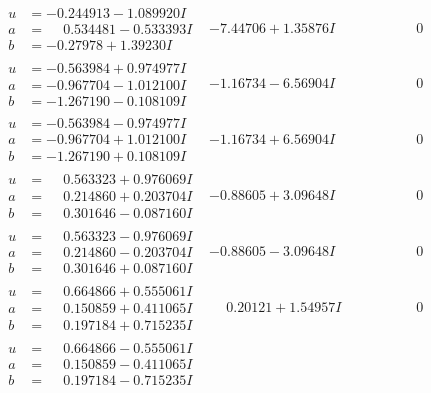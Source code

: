 \documentclass[1p]{elsarticle_modified}
\theoremstyle{definition}
\begin{document}
$$\begin{array}{c|c|c}
\begin{aligned}
u &= -0.244913 - 1.089920 I \\
a &= \phantom{-}0.534481 - 0.533393 I \\
b &= -0.27978 + 1.39230 I\end{aligned}
 & -7.44706 + 1.35876 I & \phantom{-0.000000 } 0 \\ \hline\begin{aligned}
u &= -0.563984 + 0.974977 I \\
a &= -0.967704 - 1.012100 I \\
b &= -1.267190 - 0.108109 I\end{aligned}
 & -1.16734 - 6.56904 I & \phantom{-0.000000 } 0 \\ \hline\begin{aligned}
u &= -0.563984 - 0.974977 I \\
a &= -0.967704 + 1.012100 I \\
b &= -1.267190 + 0.108109 I\end{aligned}
 & -1.16734 + 6.56904 I & \phantom{-0.000000 } 0 \\ \hline\begin{aligned}
u &= \phantom{-}0.563323 + 0.976069 I \\
a &= \phantom{-}0.214860 + 0.203704 I \\
b &= \phantom{-}0.301646 - 0.087160 I\end{aligned}
 & -0.88605 + 3.09648 I & \phantom{-0.000000 } 0 \\ \hline\begin{aligned}
u &= \phantom{-}0.563323 - 0.976069 I \\
a &= \phantom{-}0.214860 - 0.203704 I \\
b &= \phantom{-}0.301646 + 0.087160 I\end{aligned}
 & -0.88605 - 3.09648 I & \phantom{-0.000000 } 0 \\ \hline\begin{aligned}
u &= \phantom{-}0.664866 + 0.555061 I \\
a &= \phantom{-}0.150859 + 0.411065 I \\
b &= \phantom{-}0.197184 + 0.715235 I\end{aligned}
 & \phantom{-}0.20121 + 1.54957 I & \phantom{-0.000000 } 0 \\ \hline\begin{aligned}
u &= \phantom{-}0.664866 - 0.555061 I \\
a &= \phantom{-}0.150859 - 0.411065 I \\
b &= \phantom{-}0.197184 - 0.715235 I\end{aligned}

\end{array}$$
\end{document}
